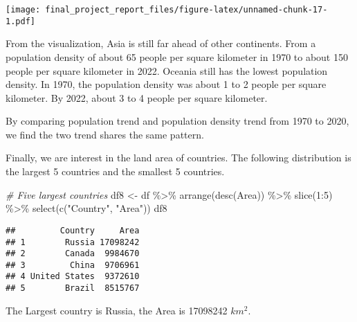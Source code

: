 \documentclass[
]{article}
\newenvironment{Shaded}{\begin{snugshade}}{\end{snugshade}}
\newcommand{\CommentTok}[1]{\textcolor[rgb]{0.56,0.35,0.01}{\textit{#1}}}
\newcommand{\DecValTok}[1]{\textcolor[rgb]{0.00,0.00,0.81}{#1}}
\newcommand{\FunctionTok}[1]{\textcolor[rgb]{0.00,0.00,0.00}{#1}}
\newcommand{\NormalTok}[1]{#1}
\newcommand{\OtherTok}[1]{\textcolor[rgb]{0.56,0.35,0.01}{#1}}
\newcommand{\SpecialCharTok}[1]{\textcolor[rgb]{0.00,0.00,0.00}{#1}}
\newcommand{\StringTok}[1]{\textcolor[rgb]{0.31,0.60,0.02}{#1}}
\begin{document}
\texttt{[image: final\_project\_report\_files/figure-latex/unnamed-chunk-17-1.pdf]}

From the visualization, Asia is still far ahead of other continents.
From a population density of about 65 people per square kilometer in
1970 to about 150 people per square kilometer in 2022. Oceania still has
the lowest population density. In 1970, the population density was about
1 to 2 people per square kilometer. By 2022, about 3 to 4 people per
square kilometer.

By comparing population trend and population density trend from 1970 to
2020, we find the two trend shares the same pattern.

Finally, we are interest in the land area of countries. The following
distribution is the largest 5 countries and the smallest 5 countries.

\begin{Shaded}
\begin{Highlighting}[]
\CommentTok{\# Five largest countries}
\NormalTok{df8 }\OtherTok{\textless{}{-}}\NormalTok{ df }\SpecialCharTok{\%\textgreater{}\%} \FunctionTok{arrange}\NormalTok{(}\FunctionTok{desc}\NormalTok{(Area)) }\SpecialCharTok{\%\textgreater{}\%} \FunctionTok{slice}\NormalTok{(}\DecValTok{1}\SpecialCharTok{:}\DecValTok{5}\NormalTok{) }\SpecialCharTok{\%\textgreater{}\%} \FunctionTok{select}\NormalTok{(}\FunctionTok{c}\NormalTok{(}\StringTok{"Country"}\NormalTok{, }\StringTok{"Area"}\NormalTok{))}
\NormalTok{df8}
\end{Highlighting}
\end{Shaded}

\begin{verbatim}
##         Country     Area
## 1        Russia 17098242
## 2        Canada  9984670
## 3         China  9706961
## 4 United States  9372610
## 5        Brazil  8515767
\end{verbatim}

The Largest country is Russia, the Area is 17098242 \(km^2\).
\end{document}
